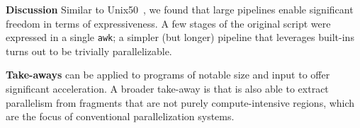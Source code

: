 \documentclass[letterpaper,twocolumn,10pt]{article}
\newcommand{\heading}[1]{\vspace{4pt}\noindent\textbf{#1}\enspace}
\newcommand{\ttt}[1]{\texttt{#1}}
\newcommand{\todo}[1]{\hl{#1}\xspace}
\newcommand{\nv}[1]{[{\color{cyan}nv: #1}]}
\newcommand{\kk}[1]{[{\color{magenta}kk: #1}]}
\begin{document}

\heading{Discussion}
Similar to Unix50~, we found that large pipelines enable significant freedom in terms of expressiveness.
A few stages of the original script were expressed in a single \ttt{awk};
  a simpler (but longer) pipeline that leverages \unix built-ins %
  turns out to be trivially parallelizable.




\heading{Take-aways}
\sys can be applied to programs of notable size and input
to offer significant acceleration.
A broader take-away is that \sys is also able to extract parallelism from fragments that are not purely compute-intensive regions, which are the focus of conventional parallelization systems.  


\end{document}
